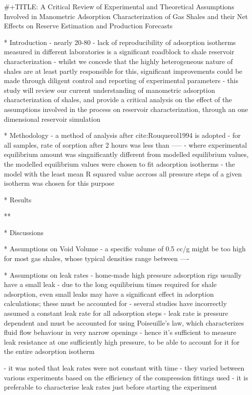 


#+TITLE: A Critical Review of Experimental and Theoretical Assumptions Involved in Manometric Adsorption Characterization of Gas Shales and their Net Effects on Reserve Estimation and Production Forecasts

* Introduction
- nearly 20-80%
- lack of reproducibility of adsorption isotherms measured in different laboratories is a significant roadblock to shale reservoir characterization
- whilst we concede that the highly heterogeneous nature of shales are at least partly responsible for this, significant improvements could be made through diligent control and reporting of experimental parameters
- this study will review our current understanding of manometric adsorption characterization of shales, and provide a critical analysis on the effect of the assumptions involved in the process on reservoir characterization, through an one dimensional reservoir simulation

* Methodology
- a method of analysis after cite:Rouquerol1994 is adopted
- for all samples, rate of sorption after 2 hours was less than -----
- where experimental equilibrium amount was singnificantly different from modelled equilibrium values, the modelled equilibrium values were chosen to fit adsorption isotherms
- the model with the least mean R squared value accross all pressure steps of a given isotherm was chosen for this purpose

* Results
  
** 

* Discussions

* Assumptions on Void Volume
- a specific volume of 0.5 cc/g might be too high for most gas shales, whose typical densities range between ----

* Assumptions on leak rates
- home-made high pressure adsorption rigs usually have a small leak
- due to the long equilibrium times required for shale adsorption, even small leaks may have a significant effect in adorption calculations; these must be accounted for
- several studies have incorrectly assumed a constant leak rate for all adsorption steps
- leak rate is pressure dependent and must be accounted for using Poiseuille's law, which characterizes fluid flow behaviour in very narrow openings
- hence it's sufficient to measure leak resistance at one sufficiently high pressure, to be able to account for it for the entire adsorption isotherm

- it was noted that leak rates were not constant with time - they varied between various experiments based on the efficiency of the compression fittings used
- it is preferable to characterise leak rates just before starting the experiment

